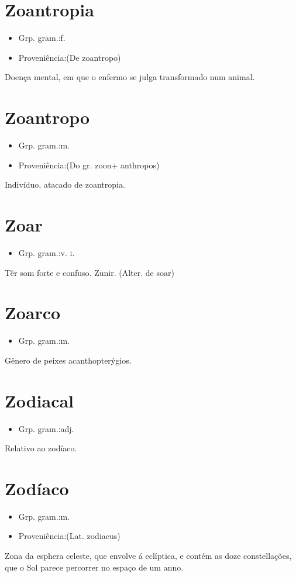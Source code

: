 \section{Zoantropia}
\begin{itemize}
\item {Grp. gram.:f.}
\end{itemize}
\begin{itemize}
\item {Proveniência:(De \textunderscore zoantropo\textunderscore )}
\end{itemize}
Doença mental, em que o enfermo se julga transformado num animal.
\section{Zoantropo}
\begin{itemize}
\item {Grp. gram.:m.}
\end{itemize}
\begin{itemize}
\item {Proveniência:(Do gr. \textunderscore zoon\textunderscore  + \textunderscore anthropos\textunderscore )}
\end{itemize}
Indivíduo, atacado de zoantropia.
\section{Zoar}
\begin{itemize}
\item {Grp. gram.:v. i.}
\end{itemize}
Têr som forte e confuso.
Zunir.
(Alter. de \textunderscore soar\textunderscore )
\section{Zoarco}
\begin{itemize}
\item {Grp. gram.:m.}
\end{itemize}
Gênero de peixes acanthopterýgios.
\section{Zodiacal}
\begin{itemize}
\item {Grp. gram.:adj.}
\end{itemize}
Relativo ao zodíaco.
\section{Zodíaco}
\begin{itemize}
\item {Grp. gram.:m.}
\end{itemize}
\begin{itemize}
\item {Proveniência:(Lat. \textunderscore zodiacus\textunderscore )}
\end{itemize}
Zona da esphera celeste, que envolve á eclíptica, e contém as doze constellações, que o Sol parece percorrer no espaço de um anno.
